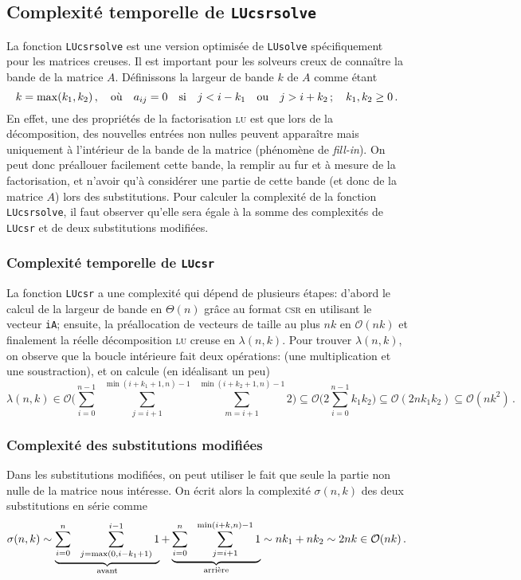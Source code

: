 \documentclass[11pt]{article}
\begin{document}
\subsection{Complexité temporelle de \texttt{LUcsrsolve}}
\label{sec:LUcsrsolve}
La fonction \lstinline|LUcsrsolve| est une version optimisée de \lstinline|LUsolve| spécifiquement pour les matrices creuses.
Il est important pour les solveurs creux de connaître la bande de la matrice $A$.
Définissons la largeur de bande $k$ de $A$ comme étant
\[
k = \max(k_1, k_2)\,, \quad \textnormal{où} \quad a_{ij} = 0 \quad \textnormal{si} \quad j < i - k_1 \quad \textnormal{ou} \quad j > i + k_2\,; \quad k_1, k_2 \ge 0\,.
\]
En effet, une des propriétés de la factorisation \textsc{lu} est que lors de la décomposition, des nouvelles entrées non nulles peuvent apparaître mais uniquement à l'intérieur de la bande de la matrice (phénomène de \emph{fill-in}). On peut donc préallouer facilement cette bande, la remplir au fur et à mesure de la factorisation, et n'avoir qu'à considérer une partie de cette bande (et donc de la matrice $A$) lors des substitutions. Pour calculer la complexité de la fonction \lstinline|LUcsrsolve|, il faut observer qu'elle sera égale à la somme des complexités de \lstinline|LUcsr| et de deux substitutions modifiées.
\subsubsection{Complexité temporelle de \texttt{LUcsr}}
La fonction \lstinline|LUcsr| a une complexité qui dépend de plusieurs étapes: d'abord le calcul de la largeur de bande en $\Theta(n)$ grâce au format \textsc{csr} en utilisant le vecteur \lstinline|iA|; ensuite, la préallocation de vecteurs de taille au plus $nk$ en $\mathcal{O}(nk)$ et finalement la réelle décomposition \textsc{lu} creuse en $\lambda(n, k)$. Pour trouver $\lambda(n, k)$, on observe que la boucle intérieure fait deux opérations: (une multiplication et une soustraction), et on calcule (en idéalisant un peu)
\[
\lambda(n, k) \in \mathcal{O}\Bigg(\sum_{i=0}^{n-1}\ \  \sum_{j = i+1}^{\min(i+k_1+1, n)-1} \ \ \sum_{m = i+1}^{\min(i+k_2+1, n)-1} 2\Bigg) \subseteq \mathcal{O}\Bigg(2 \sum_{i=0}^{n-1} k_1 k_2\Bigg) \subseteq \mathcal{O}(2nk_1k_2) \subseteq \mathcal{O}(n k^2)\,.
\]
\subsubsection{Complexité des substitutions modifiées}
Dans les substitutions modifiées, on peut utiliser le fait que seule la partie non nulle de la matrice nous intéresse. On écrit alors la complexité $\sigma(n, k)$ des deux substitutions en série comme
\[
\sigma(n, k) \sim \underbrace{\sum_{i=0}^{n} \ \ \sum_{j=\max(0, i-k_1+1)}^{i-1} 1}_{\textnormal{avant}} + \underbrace{\sum_{i=0}^{n} \ \ \sum_{j=i+1}^{\min(i+k, n)-1} 1}_{\textnormal{arrière}} \sim nk_1 + nk_2 \sim 2nk \in \mathcal{O}(nk)\,.
\]
\end{document}
